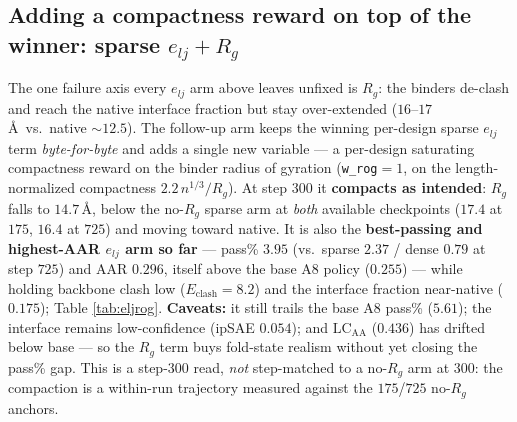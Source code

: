\documentclass[11pt]{article}
\newcommand{\ttk}[1]{\texttt{\small #1}}
\begin{document}
\subsection{Adding a compactness reward on top of the winner: sparse \texorpdfstring{$e_{lj}+R_g$}{e\_lj + Rg}}
\label{sec:elj-rog}
The one failure axis every $e_{lj}$ arm above leaves unfixed is $R_g$: the binders de-clash and reach
the native interface fraction but stay over-extended ($16$--$17$\,\AA\ vs.\ native $\sim\!12.5$). The
follow-up arm keeps the winning per-design sparse $e_{lj}$ term \emph{byte-for-byte} and adds a single
new variable --- a per-design saturating compactness reward on the binder radius of gyration
(\ttk{w\_rog}$=1$, on the length-normalized compactness $2.2\,n^{1/3}/R_g$). At step $300$ it
\textbf{compacts as intended}: $R_g$ falls to $14.7$\,\AA, below the no-$R_g$ sparse arm at
\emph{both} available checkpoints ($17.4$ at $175$, $16.4$ at $725$) and moving toward native. It is
also the \textbf{best-passing and highest-AAR $e_{lj}$ arm so far} --- pass\% $3.95$ (vs.\ sparse
$2.37$ / dense $0.79$ at step $725$) and AAR $0.296$, itself above the base A8 policy ($0.255$) --- while
holding backbone clash low ($E_{\mathrm{clash}}=8.2$) and the interface fraction near-native ($0.175$);
Table \ref{tab:eljrog}. \textbf{Caveats:} it still trails the base A8 pass\% ($5.61$); the interface
remains low-confidence (ipSAE $0.054$); and $\mathrm{LC}_{\mathrm{AA}}$ ($0.436$) has drifted below base
--- so the $R_g$ term buys fold-state realism without yet closing the pass\% gap. This is a step-$300$
read, \emph{not} step-matched to a no-$R_g$ arm at $300$: the compaction is a within-run trajectory
measured against the $175$/$725$ no-$R_g$ anchors.
\end{document}

